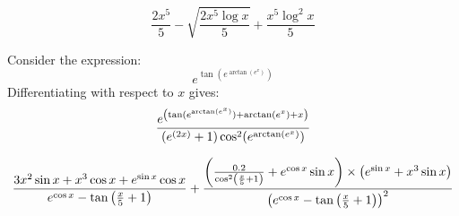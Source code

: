 $$ \frac{2x^5}{5} - \sqrt{\frac{2x^5 \log x}{5}} 
+ \frac{x^5\log^2 x}{5}$$

Consider the expression:
\[ e^{\tan(e^{\arctan(e^x)})}\]
Differentiating with respect to $x$ gives: 
\[
  {e^{\left( \tan(e^{\arctan(e^x)}) + \arctan(e^x) + x \right)} 
       \over (e^{(2 x)} + 1) \cos^2(e^{\arctan(e^x)})}
     \]
     

\[  {3 x^2 \sin{x} + x^3 \cos{x} + e^{\sin{x}} \cos{x} 
       \over e^{\cos{x}} - \tan\left( {x \over 5} + 1 \right)} 
      + {\left( {0.2 \over \cos^2 \left( {x \over 5} + 1 \right)} 
      + e^{\cos{x}} \sin{x} \right) 
           \times \left( e^{\sin{x}} + x^3 \sin{x} \right) 
           \over \left( e^{\cos{x}} 
      - \tan\left( {x \over 5} + 1 \right) \right)^2}
    \]


    \deactivatevariablesubstitution 





